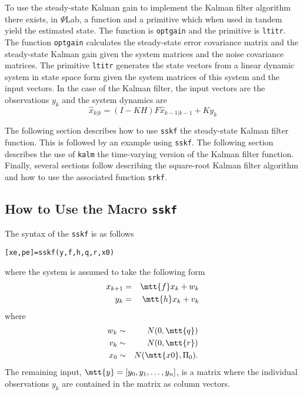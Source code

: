	To use the steady-state
Kalman gain to implement the Kalman filter algorithm there exists,
in $\Psi$Lab, a function and a primitive which when 
used in tandem yield the estimated state.
The function is {\tt optgain} and the primitive is {\tt ltitr}.  The function
{\tt optgain} calculates the steady-state error covariance matrix
and the steady-state Kalman gain given the system matrices and the
noise covariance matrices.  The primitive {\tt ltitr} generates
the state vectors from a linear dynamic system in state space form
given the system matrices of this system and the input vectors.
In the case of the Kalman filter, the input vectors are the observations
$y_k$ and the system dynamics are
%
\begin{equation}
\hat{x}_{k|k}=(I-KH)F\hat{x}_{k-1|k-1}+Ky_k
\label{e.kf34a}
\end{equation}
%

	The following section describes how to use {\tt sskf} the steady-state 
Kalman filter function.  This is followed by an example using {\tt sskf}.
The following section describes the use of {\tt kalm} the time-varying
version of the Kalman filter function.  Finally, several sections follow
describing the square-root Kalman filter algorithm and how to use the
associated function {\tt srkf}.

\subsection{How to Use the Macro {\tt sskf}}

	The syntax of the {\tt sskf} is as follows
\begin{verbatim}
[xe,pe]=sskf(y,f,h,q,r,x0)
\end{verbatim}
where the system is assumed to take the following form
%
\begin{eqnarray}
x_{k+1}&=&\mtt{ f}x_k+w_k\nonumber\\
y_k&=&\mtt{ h}x_k+v_k\nonumber
\end{eqnarray}
%
where
%
\begin{eqnarray}
w_k&\sim& N(0,\mtt{ q})\nonumber\\
v_k&\sim& N(0,\mtt{ r})\nonumber\\
x_0&\sim& N(\mtt{ x0},\Pi_0).\nonumber
\end{eqnarray}
%
The remaining input, $\mtt{ y}=[y_0,y_1,\ldots,y_n]$, is a matrix where
the individual observations $y_k$ are contained in the matrix as
column vectors.

